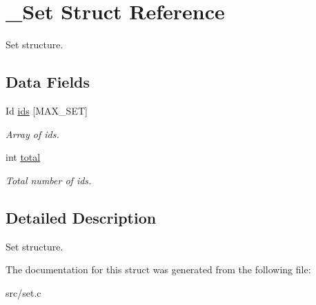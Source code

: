 \hypertarget{struct__Set}{}\section{\+\_\+\+Set Struct Reference}
\label{struct__Set}


Set structure.  


\subsection*{Data Fields}
\begin{DoxyCompactItemize}
\item 
\mbox{\label{struct__Set_a3b2034bbfee5ca2b0dde5b6073c264cc}} 
Id \hyperlink{struct__Set_a3b2034bbfee5ca2b0dde5b6073c264cc}{ids} \mbox{[}M\+A\+X\+\_\+\+S\+ET\mbox{]}
\begin{DoxyCompactList}\small\item\em Array of id\textquotesingle{}s. \end{DoxyCompactList}\item 
\mbox{\label{struct__Set_a9ae5f2cab9df62f0a98dd683be804878}} 
int \hyperlink{struct__Set_a9ae5f2cab9df62f0a98dd683be804878}{total}
\begin{DoxyCompactList}\small\item\em Total number of id\textquotesingle{}s. \end{DoxyCompactList}\end{DoxyCompactItemize}


\subsection{Detailed Description}
Set structure. 

The documentation for this struct was generated from the following file\+:\begin{DoxyCompactItemize}
\item 
src/set.\+c\end{DoxyCompactItemize}
